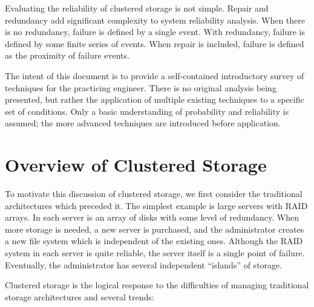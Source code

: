 \documentclass[11pt]{article}
\numberwithin{equation}{section}
\begin{document}
Evaluating the reliability of clustered storage is not simple.  Repair and
redundancy add significant complexity to system reliability analysis.  When
there is no redundancy, failure is defined by a single event.  With
redundancy, failure is defined by some finite series of events.  When repair
is included, failure is defined as the proximity of failure events. 

The intent of this document is to provide a self-contained introductory survey
of techniques for the practicing engineer.  There is no original analysis
being presented, but rather the application of multiple existing techniques
to a specific set of conditions.  Only a basic understanding of probability
and reliability is assumed; the more advanced techniques are introduced before
application.  

\section{Overview of Clustered Storage}
\label{sec-model}

To motivate this discussion of clustered storage, we first consider the
traditional architectures which preceded it.  The simplest example is large
servers with RAID arrays.  In each server is an array of disks with some level
of redundancy.  When more storage is needed, a new server is purchased, and
the administrator creates a new file system which is independent of the
existing ones.  Although the RAID system in each server is quite reliable, the
server itself is a single point of failure.  Eventually, the administrator has
several independent ``islands'' of storage.

Clustered storage is the logical response to the difficulties of managing
traditional storage architectures and several trends:  
\end{document}

